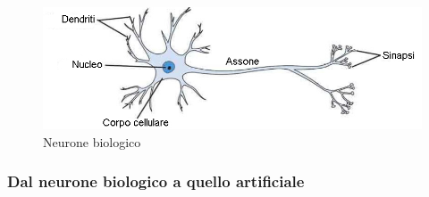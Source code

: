 \documentclass[a4paper,11pt]{article}
\begin{document}
    \begin{figure}[h]
        \centering
        \includegraphics[scale=0.7]{cervello.jpg}
        \caption{Neurone biologico}
    \end{figure}

    \subsubsection{Dal neurone biologico a quello artificiale}
    
\end{document}
